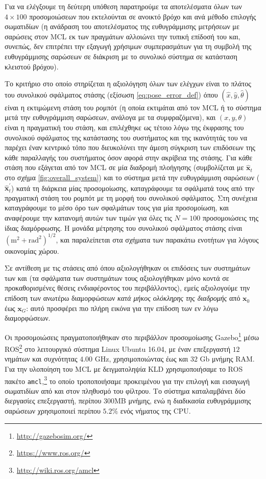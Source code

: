 Για να ελέγξουμε τη δεύτερη υπόθεση παρατηρούμε τα αποτελέσματα όλων των
$4\times100$ προσομοιώσεων που εκτελούνται σε ανοικτό βρόχο και ανά μέθοδο
επιλογής σωματιδίων (η ανάδραση του αποτελέσματος της ευθυγράμμισης μετρήσεων
με σαρώσεις στον MCL εκ των πραγμάτων αλλοιώνει την τυπική επίδοσή του και,
συνεπώς, δεν επιτρέπει την εξαγωγή χρήσιμων συμπερασμάτων για τη συμβολή της
ευθυγράμμισης σαρώσεων σε διάκριση με το συνολικό σύστημα σε κατάσταση κλειστού
βρόχου).

Το κριτήριο στο οποίο στηρίζεται η αξιολόγηση όλων των ελέγχων είναι το πλάτος
του συνολικού σφάλματος στάσης (εξίσωση \ref{eq:pose_error_def}) όπου
$(\hat{x}, \hat{y}, \hat{\theta})$ είναι η εκτιμώμενη στάση του ρομπότ (η οποία
εκτιμάται από τον MCL ή το σύστημα μετά την ευθυγράμμιση σαρώσεων, ανάλογα με
τα συμφραζόμενα), και $(x,y,\theta)$ είναι η πραγματική του στάση, και
επιλέχθηκε ως τέτοιο λόγω της έκφρασης του συνολικού σφάλματος της κατάστασης
του συστήματος και της ικανότητάς του να παρέχει έναν κεντρικό τόπο που
διευκολύνει την άμεση σύγκριση των επιδόσεων της κάθε παραλλαγής του συστήματος
όσον αφορά στην ακρίβεια της στάσης. Για κάθε στάση που εξάγεται από τον MCL σε
μία διαδρομή πλοήγησης (συμβολίζεται με $\hat{\bm{x}}_t$ στο σχήμα
\ref{fig:overall_system}) και το σύστημα μετά την ευθυγράμμιση σαρώσεων
($\hat{\bm{x}}^{\prime}_t$) κατά τη διάρκεια μίας προσομοίωσης, καταγράφουμε τα
σφάλματά τους από την πραγματική στάση του ρομπότ με τη μορφή του συνολικού
σφάλματος. Στη συνέχεια καταγράφουμε το μέσο όρο των σφαλμάτων τους για μία
προσομοίωση, και αναφέρουμε την κατανομή αυτών των τιμών για όλες τις $N = 100$
προσομοιώσεις της ίδιας διαμόρφωσης. Η μονάδα μέτρησης του συνολικού σφάλματος
στάσης είναι $(\text{m}^2+\text{rad}^2)^{1/2}$, και παραλείπεται στα σχήματα
των παρακάτω ενοτήτων για λόγους οικονομίας χώρου.

Σε αντίθεση με τις στάσεις από όπου αξιολογήθηκαν οι επιδόσεις των συστημάτων
των \cite{Rowekamper2012a} και \cite{Vasiljevic2016a} (τα σφάλματα των
συστημάτων τους αξιολογήθηκαν μόνο κοντά σε προκαθορισμένες θέσεις
ενδιαφέροντος του περιβάλλοντος), εμείς αξιολογούμε την επίδοση των ανωτέρω
διαμορφώσεων \textit{κατά μήκος ολόκληρης της διαδρομής} από $\bm{x}_0$ έως
$\bm{x}_G$: αυτό προσφέρει πιο πλήρη εικόνα για την επίδοση των εν λόγω
διαμορφώσεων.

Οι προσομοιώσεις πραγματοποιήθηκαν στο περιβάλλον προσομοίωσης
Gazebo\footnote{\url{http://gazebosim.org/}} μέσω
ROS\footnote{\url{https://www.ros.org/}} στο λειτουργικό σύστημα Linux Ubuntu
16.04, με έναν επεξεργαστή $12$ νημάτων και συχνότητας $4.00$ GHz,
χρησιμοποιώντας έως και $32$ Gb μνήμης RAM. Για την υλοποίηση του MCL με
δειγματοληψία KLD χρησιμοποιήσαμε το ROS πακέτο
\texttt{amcl},\footnote{\url{http://wiki.ros.org/amcl}} το οποίο τροποποιήσαμε
προκειμένου για την επιλογή και εισαγωγή σωματιδίων από και στον πληθυσμό του
φίλτρου. Το σύστημα καταλαμβάνει δύο διεργασίες επεξεργαστή, περίπου 300MB
μνήμης, ενώ η διαδικασία ευθυγράμμισης σαρώσεων χρησιμοποιεί περίπου $5.2\%$
ενός νήματος της CPU.


